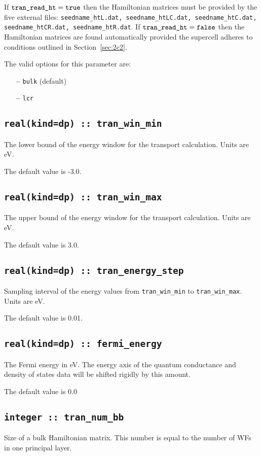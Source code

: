 If $\verb#tran_read_ht# = \verb#true#$ then the
Hamiltonian matrices must be provided by
the five external files:
{\tt seedname\_htL.dat, seedname\_htLC.dat, seedname\_htC.dat,
seedname\_htCR.dat, seedname\_htR.dat}.
If $\verb#tran_read_ht# = \verb#false#$ then the Hamiltonian
matrices are found automatically provided the supercell adheres to 
conditions outlined in Section~\ref{sec:2c2}.

The valid options for this parameter are:
\begin{itemize}
\item[{\bf --}] \verb#bulk#  (default)
\item[{\bf --}] \verb#lcr# 
\end{itemize}

\subsection[tran\_win\_min]{\tt real(kind=dp) :: tran\_win\_min}
The lower bound of the energy window for the transport calculation. 
Units are eV.

The default value is -3.0.

\subsection[tran\_win\_max]{\tt real(kind=dp) :: tran\_win\_max}
The upper bound of the energy window for the transport calculation. 
Units are eV.

The default value is 3.0.

\subsection[tran\_energy\_step]{\tt real(kind=dp) :: tran\_energy\_step}
Sampling interval of the energy values from \verb#tran_win_min# 
to \verb#tran_win_max#. 
Units are eV.

The default value is 0.01.

\subsection[fermi\_energy]{\tt real(kind=dp) :: fermi\_energy}
The Fermi energy in eV. The energy axis of the quantum conductance and
density of states data will be shifted rigidly by this amount.

The default value is 0.0

\subsection[tran\_num\_bb]{\tt integer :: tran\_num\_bb}
Size of a bulk Hamiltonian matrix.
This number is equal to the number of WFs in one principal
layer. 

